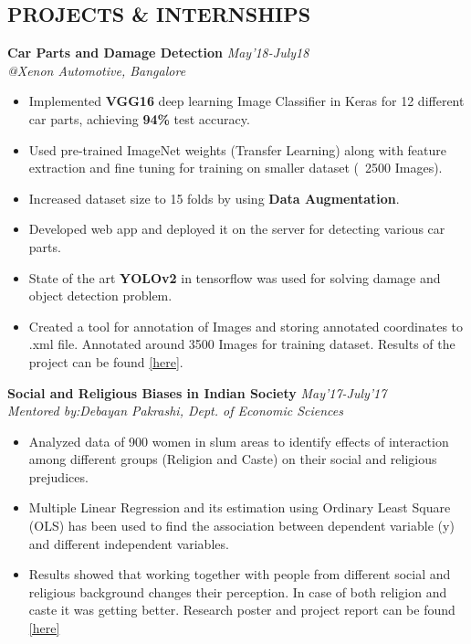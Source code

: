 \documentclass[margin]{res}
\begin{document}
\begin{resume}
\section{PROJECTS \& INTERNSHIPS}
\textbf{Car Parts and Damage Detection} \hfill \textit{May’18-July18}\\
\textit{@Xenon Automotive, Bangalore}
\begin{itemize}
\item Implemented \textbf{VGG16} deep learning Image Classifier in Keras for 12 different car parts, achieving \textbf{94\% } test accuracy.
\item Used pre-trained ImageNet weights (Transfer Learning) along with feature extraction and fine tuning for training on smaller dataset (~2500 Images).
\item Increased dataset size to 15 folds by using \textbf{Data Augmentation}.
\item Developed web app and deployed it on the server for detecting various car parts.
\item State of the art \textbf{YOLOv2} in tensorflow was used for solving damage and  object detection problem.
\item Created a tool for annotation of Images and storing annotated coordinates to .xml file. Annotated around 3500 Images for training dataset. Results of the project can be found \href{https://github.com/bhavykhatri/car-damage-detection-xenon}{ [here]}.
\end{itemize}
\textbf{Social and Religious Biases in Indian Society} \hfill \textit{May’17-July’17}\\
\textit{Mentored by:Debayan Pakrashi, Dept. of Economic Sciences}
\begin{itemize}
\item Analyzed data of 900 women in slum areas to identify effects of interaction among different groups (Religion and Caste) on their social and religious prejudices.
\item Multiple Linear Regression and its estimation using Ordinary Least Square (OLS) has been used to find the association between dependent variable (y) and different independent variables.
\item Results showed that working together with people from different social and religious background changes their perception. In case of both religion and caste it was getting better. Research poster and project report can be found \href{https://github.com/bhavykhatri/surge-2017-social-and-religious-biases-project}{[here]}

\end{itemize}
\end{resume}
\end{document}

